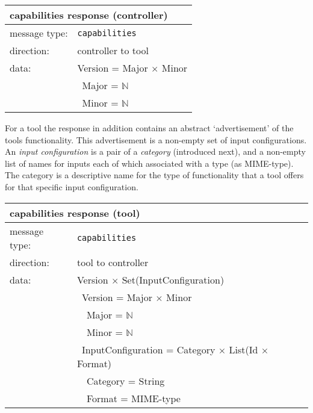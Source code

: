 \documentclass{article}
\newcommand{\msg}[1]{\texttt{#1}}
\begin{document}
   \begin{table}[H]
    \begin{center}
     \begin{tabular}{|ll|}
      \hline
       \multicolumn{2}{|l|}{\textbf{capabilities response (controller)}} \\
      \hline
       message type:   & \msg{capabilities} \\
      \hline
       direction:      & controller to tool \\
       data:           & Version = Major $\times$ Minor \\
                       & \ Major = $\mathbb{N}$ \\
                       & \ Minor = $\mathbb{N}$ \\
      \hline
     \end{tabular}
    \end{center}
    \vspace{-0.3cm}
   \end{table}

   \noindent For a tool the response in addition contains an abstract
   `advertisement' of the tools functionality. This advertisement is a
   non-empty set of input configurations.  An \textit{input configuration} is a
   pair of a \textit{category} (introduced next), and a non-empty list of names
   for inputs each of which associated with a type (as MIME-type).  The
   category is a descriptive name for the type of functionality that a tool
   offers for that specific input configuration.
   
   \begin{table}[H]
    \begin{center}
     \begin{tabular}{|ll|}
      \hline
       \multicolumn{2}{|l|}{\textbf{capabilities response (tool)}} \\
      \hline
       message type:   & \msg{capabilities} \\
      \hline
       direction:      & tool to controller \\
       data:           & Version $\times$ Set(InputConfiguration) \\
                       & \ Version = Major $\times$ Minor \\
                       & \ \ Major = $\mathbb{N}$ \\
                       & \ \ Minor = $\mathbb{N}$ \\
                       & \ InputConfiguration = Category $\times$ List(Id $\times$ Format) \\
                       & \ \ Category = String \\
                       & \ \ Format = MIME-type \\
      \hline
     \end{tabular}
    \end{center}
    \vspace{-0.3cm}
   \end{table}
\end{document}

